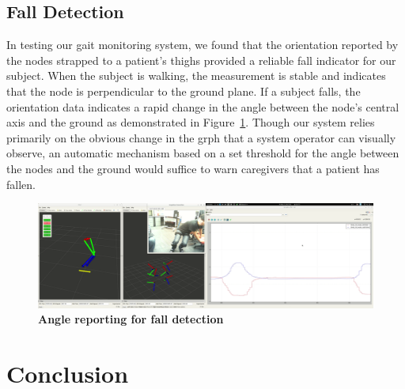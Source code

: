 \documentclass[conference]{IEEEtran}
\begin{document}
\subsection{Fall Detection}
In testing our gait monitoring system, we found that the orientation reported by the nodes
strapped to a patient's thighs provided a reliable fall indicator for our subject. When
the subject is walking, the measurement is stable and indicates that the node is
perpendicular to the ground plane. If a subject falls, the orientation data indicates a
rapid change in the angle between the node's central axis and the ground as demonstrated
in Figure~\ref{fig:falling}. Though our system relies primarily on the obvious change in
the grph that a system operator can visually observe, an automatic mechanism based on a
set threshold for the angle between the nodes and the ground would suffice to warn
caregivers that a patient has fallen. 

\begin{figure}[h]
  \centering
  \includegraphics[width=.99\columnwidth]{figs/falling}
  \caption{{\bf Angle reporting for fall detection }}
  \label{fig:falling}
\end{figure}


\section{Conclusion} 


\balance

\end{document}
